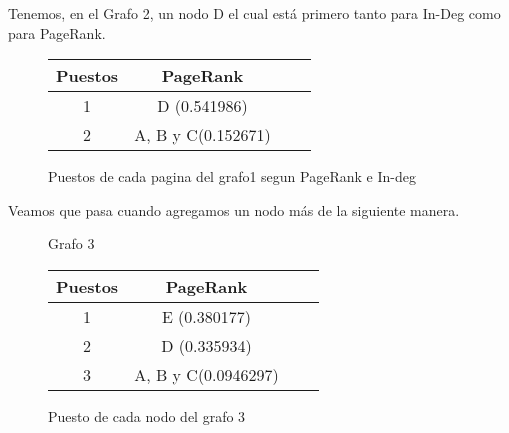 Tenemos, en el Grafo 2, un nodo D el cual está primero tanto para In-Deg como para PageRank.

\begin{figure}[H]
\centering
\begin{tabular}{| c | c | c | c |}
  \hline
  Puestos & PageRank\\ \hline \hline
  1 & D (0.541986)\\ \hline
  2 & A, B y C(0.152671)\\ \hline
\end{tabular}
  \caption{\footnotesize{Puestos de cada pagina del grafo1 segun PageRank e In-deg}}
  \label{fig:Rankings}
\end{figure}

Veamos que pasa cuando agregamos un nodo más de la siguiente manera.

\begin{figure}[H]
\centering
{}
  \caption{\footnotesize{ Grafo 3 }}
  \label{fig:Rankings}
\end{figure}

\begin{figure}[H]
\centering
\begin{tabular}{| c | c | c | c |}
  \hline
  Puestos & PageRank\\ \hline \hline
  1 & E (0.380177)\\ \hline
  2 & D (0.335934)\\ \hline
  3 & A, B y C(0.0946297)\\ \hline
\end{tabular}
  \caption{\footnotesize{Puesto de cada nodo del grafo 3}}
  \label{fig:Rankings}
\end{figure}

